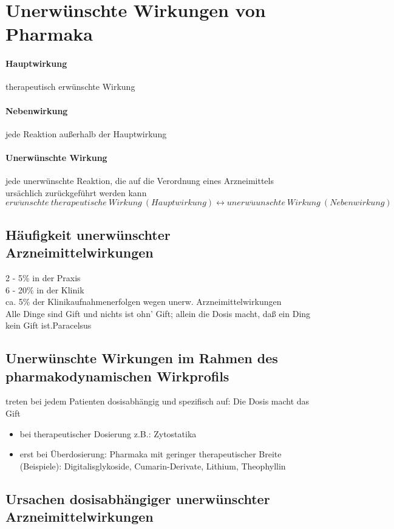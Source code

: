 \documentclass[10pt,a4paper]{report}
\begin{document}
\section{Unerwünschte Wirkungen von Pharmaka}
\paragraph{Hauptwirkung} therapeutisch erwünschte Wirkung
\paragraph{Nebenwirkung} jede Reaktion außerhalb der Hauptwirkung
\paragraph{Unerwünschte Wirkung} jede unerwünschte Reaktion, die auf die Verordnung eines Arzneimittels ursächlich zurückgeführt werden kann
\begin{equation}
erw\ddot{u}nschte\:therapeutische\:Wirkung\:(Hauptwirkung) \longleftrightarrow  unerw\ddot{u}unschte\:Wirkung\:(Nebenwirkung)
\end{equation}

\subsection{Häufigkeit unerwünschter Arzneimittelwirkungen}
2 - 5\% in der Praxis 		\\
6 - 20\% in der Klinik\\
ca. 5\% der Klinikaufnahmenerfolgen wegen unerw. Arzneimittelwirkungen\\
\glqq Alle Dinge sind Gift und nichts ist ohn’ Gift; allein die Dosis macht, daß ein Ding kein Gift ist.Paracelsus\grqq
\subsection{Unerwünschte Wirkungen im Rahmen des
pharmakodynamischen Wirkprofils}
treten bei jedem Patienten dosisabhängig und spezifisch auf: \glqq Die Dosis macht das Gift\grqq
\begin{itemize}
	\item bei therapeutischer Dosierung   z.B.: Zytostatika
	\item erst bei Überdosierung: Pharmaka mit geringer therapeutischer Breite (Beispiele):	Digitalisglykoside, Cumarin-Derivate, Lithium, Theophyllin
\end{itemize}
\subsection{Ursachen dosisabhängiger unerwünschter Arzneimittelwirkungen}
\end{document}
